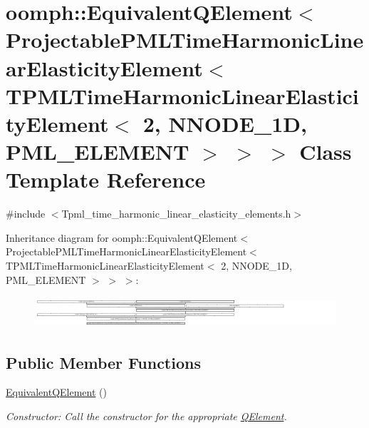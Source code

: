 \hypertarget{classoomph_1_1EquivalentQElement_3_01ProjectablePMLTimeHarmonicLinearElasticityElement_3_01TPMLT28f1822ee15ad2f831731f6bfa5d7232}{}\section{oomph\+:\+:Equivalent\+Q\+Element$<$ Projectable\+P\+M\+L\+Time\+Harmonic\+Linear\+Elasticity\+Element$<$ T\+P\+M\+L\+Time\+Harmonic\+Linear\+Elasticity\+Element$<$ 2, N\+N\+O\+D\+E\+\_\+1D, P\+M\+L\+\_\+\+E\+L\+E\+M\+E\+NT $>$ $>$ $>$ Class Template Reference}
\label{classoomph_1_1EquivalentQElement_3_01ProjectablePMLTimeHarmonicLinearElasticityElement_3_01TPMLT28f1822ee15ad2f831731f6bfa5d7232}


{\ttfamily \#include $<$Tpml\+\_\+time\+\_\+harmonic\+\_\+linear\+\_\+elasticity\+\_\+elements.\+h$>$}

Inheritance diagram for oomph\+:\+:Equivalent\+Q\+Element$<$ Projectable\+P\+M\+L\+Time\+Harmonic\+Linear\+Elasticity\+Element$<$ T\+P\+M\+L\+Time\+Harmonic\+Linear\+Elasticity\+Element$<$ 2, N\+N\+O\+D\+E\+\_\+1D, P\+M\+L\+\_\+\+E\+L\+E\+M\+E\+NT $>$ $>$ $>$\+:\begin{figure}[H]
\begin{center}
\leavevmode
\includegraphics[height=1.149897cm]{classoomph_1_1EquivalentQElement_3_01ProjectablePMLTimeHarmonicLinearElasticityElement_3_01TPMLT28f1822ee15ad2f831731f6bfa5d7232}
\end{center}
\end{figure}
\subsection*{Public Member Functions}
\begin{DoxyCompactItemize}
\item 
\hyperlink{classoomph_1_1EquivalentQElement_3_01ProjectablePMLTimeHarmonicLinearElasticityElement_3_01TPMLT28f1822ee15ad2f831731f6bfa5d7232_a6eb8e151f9091825c01e15f7ed3af381}{Equivalent\+Q\+Element} ()
\begin{DoxyCompactList}\small\item\em Constructor\+: Call the constructor for the appropriate \hyperlink{classoomph_1_1QElement}{Q\+Element}. \end{DoxyCompactList}\end{DoxyCompactItemize}
